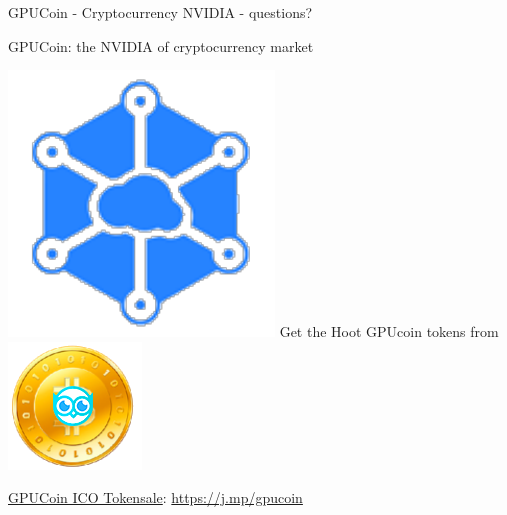 \begin{frame}[standout]{GPUCoin - Cryptocurrency NVIDIA -  questions?}
\begin{center}
GPUCoin: the NVIDIA of cryptocurrency market 
\end{center}


\includegraphics[scale=.5]{static/ipcn-p2p}
Get the Hoot GPUcoin tokens from
\includegraphics[scale=0.5]{static/hootcoin} 


 \begin{center}
\href{https://onhoot.com/static/gpucoin-ico}{GPUCoin ICO Tokensale}: 
\url{https://j.mp/gpucoin}
 \end{center}


 \begin{center}\ccbysa\end{center}

\end{frame}



 
 



% 	



